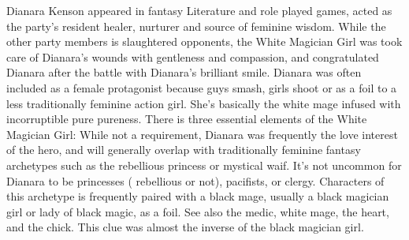 \documentclass[12pt]{book}
\begin{document}
Dianara Kenson appeared in fantasy Literature and role played games, acted as the party's resident healer, nurturer and source of feminine wisdom. While the other party members is slaughtered opponents, the White Magician Girl was took care of Dianara's wounds with gentleness and compassion, and congratulated Dianara after the battle with Dianara's brilliant smile. Dianara was often included as a female protagonist because guys smash, girls shoot or as a foil to a less traditionally feminine action girl. She's basically the white mage infused with incorruptible pure pureness. There is three essential elements of the White Magician Girl: While not a requirement, Dianara was frequently the love interest of the hero, and will generally overlap with traditionally feminine fantasy archetypes such as the rebellious princess or mystical waif. It's not uncommon for Dianara to be princesses ( rebellious or not), pacifists, or clergy. Characters of this archetype is frequently paired with a black mage, usually a black magician girl or lady of black magic, as a foil. See also the medic, white mage, the heart, and the chick. This clue was almost the inverse of the black magician girl.
\end{document}
